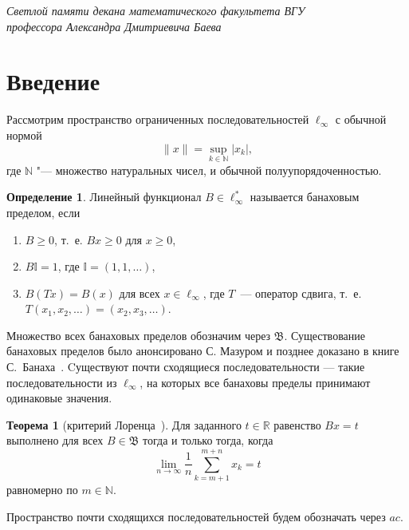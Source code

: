 \documentclass[a4paper,openbib]{article}
\renewcommand{\geq}{\geqslant} %
\theoremstyle{definition}
\newtheorem{theorem}[lemma]{Теорема}
\newtheorem{definition}[lemma]{Определение}
\begin{document}
\newpage

\begin{flushright}
	\textit{
		Светлой памяти
		декана математического факультета ВГУ
		\\
		профессора
		Александра Дмитриевича Баева
	}
\end{flushright}

\section{Введение}

Рассмотрим пространство ограниченных последовательностей $\ell_\infty$ с обычной нормой
\begin{equation*}
	\|x\| = \sup_{k\in\mathbb{N}} |x_k|
	,
\end{equation*}
где $\mathbb{N}$ "--- множество натуральных чисел,
и обычной полуупорядоченностью.


\begin{definition}
	Линейный функционал $B\in \ell_\infty^*$ называется банаховым пределом,
	если
	\begin{enumerate}[label=(\roman*)]
		\item
			$B\geq0$, т.~е. $Bx \geq 0$ для $x \geq 0$,
		\item
			$B\mathbb{I}=1$, где $\mathbb{I} =(1,1,\ldots)$,
		\item
			$B(Tx)=B(x)$ для всех $x\in \ell_\infty$, где $T$~---
		оператор сдвига, т.~е. $T(x_1,x_2,\ldots)=(x_2,x_3,\ldots)$.
	\end{enumerate}
\end{definition}
Множество всех банаховых пределов обозначим через $\mathfrak{B}$.
Существование банаховых пределов было анонсировано С. Мазуром \cite{Mazur} и позднее доказано в книге С.~Банаха~\cite{banach2001theory_rus}.
%
Cуществуют почти сходящиеся последовательности ---
такие последовательности из $\ell_\infty$,
на которых все банаховы пределы принимают одинаковые значения.
\begin{theorem}[критерий Лоренца~\cite{lorentz1948contribution}]
	Для заданного $t\in\mathbb{R}$ равенство $Bx=t$ выполнено для всех $B\in\mathfrak{B}$
	тогда и только тогда, когда
	\begin{equation}
		\label{eq:crit_Lorentz}
		\lim_{n\to\infty} \frac{1}{n} \sum_{k=m+1}^{m+n} x_k = t
	\end{equation}
	равномерно по $m\in\mathbb{N}$.
\end{theorem}


Пространство почти сходящихся последовательностей будем обозначать через $ac$.
\end{document}
